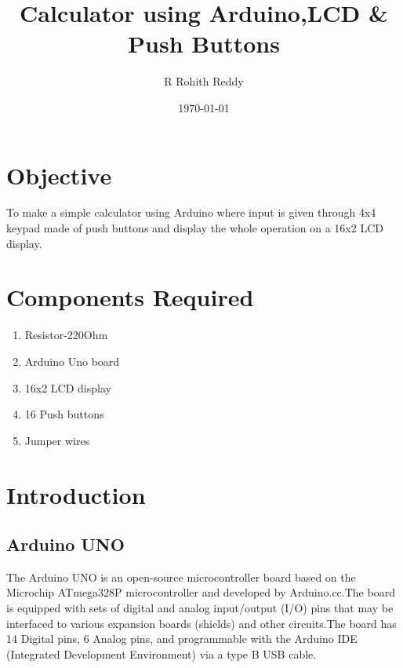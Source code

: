\documentclass[11pt]{article}
\begin{document}
\title{Calculator using Arduino,LCD \& Push Buttons}
\author{R Rohith Reddy}
\date{\today}
\maketitle


\section{Objective}
	To make a simple calculator using Arduino where input is given through 4x4 keypad made of push buttons and display the whole operation on a 16x2 LCD display.
\section{Components Required}
\begin{enumerate}
 	\item Resistor-220Ohm
 	\item Arduino Uno board
 	\item 16x2 LCD display
 	\item 16 Push buttons
 	\item Jumper wires
\end{enumerate}

\section{Introduction}
	\subsection{Arduino UNO}
		The Arduino UNO is an open-source microcontroller board based on the Microchip ATmega328P microcontroller and developed by Arduino.cc.The board is equipped with sets of digital and analog input/output (I/O) pins that may be interfaced to various expansion boards (shields) and other circuits.The board has 14 Digital pins, 6 Analog pins, and programmable with the Arduino IDE (Integrated Development Environment) via a type B USB cable.
\end{document}
